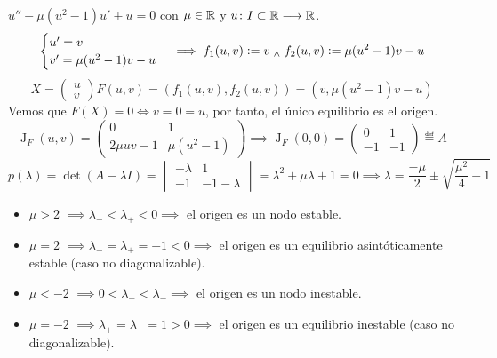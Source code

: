 \begin{ejem}
	$u'' - \mu(u^2 - 1)u' + u = 0$ con $\mu \in \mathbb{R}$ y $u \colon I\subset \mathbb{R} \longrightarrow \mathbb{R}$.
	\[\begin{cases}
			u' = v \\
			v' = \mu(u^2 - 1)v - u
		\end{cases} \implies f_1(u, v) \vcentcolon= v \; _{\wedge} \; f_2(u, v) \vcentcolon= \mu(u^2 - 1)v - u\]
	\[X = \begin{pmatrix}
			u \\
			v
		\end{pmatrix} F(u, v) = (f_1(u, v), f_2(u, v)) = (v, \mu(u^2 - 1)v - u)\]
	Vemos que $F(X) = 0 \iff v = 0 = u$, por tanto, el único equilibrio es el origen.
	\[\operatorname{J}_F(u, v) = \begin{pmatrix}
			0           & 1            \\
			2\mu uv - 1 & \mu(u^2 - 1)
		\end{pmatrix} \implies \operatorname{J}_F(0, 0) = \begin{pmatrix}
			0  & 1  \\
			-1 & -1
		\end{pmatrix} \eqdef A\]
	\[p(\lambda) = \det(A - \lambda I) = \begin{vmatrix}
			-\lambda & 1          \\
			-1       & -1-\lambda
		\end{vmatrix} = \lambda^2 + \mu \lambda + 1 = 0 \implies \lambda = \frac{-\mu}{2} \pm \sqrt{\frac{\mu^2}{4} - 1}\]
	\begin{itemize}
		\item $\mu > 2$ $\implies \lambda_- < \lambda_+ < 0 \implies$ el origen es un nodo estable.
		\item $\mu = 2$ $\implies \lambda_- = \lambda_+ = -1 < 0 \implies$ el origen es un equilibrio asintóticamente estable (caso no diagonalizable).
		\item $\mu < -2$ $\implies 0 < \lambda_+ < \lambda_- \implies$ el origen es un nodo inestable.
		\item $\mu = -2$ $\implies \lambda_+ = \lambda_- = 1 > 0 \implies$ el origen es un equilibrio inestable (caso no diagonalizable).

\end{itemize}
\end{ejem}
